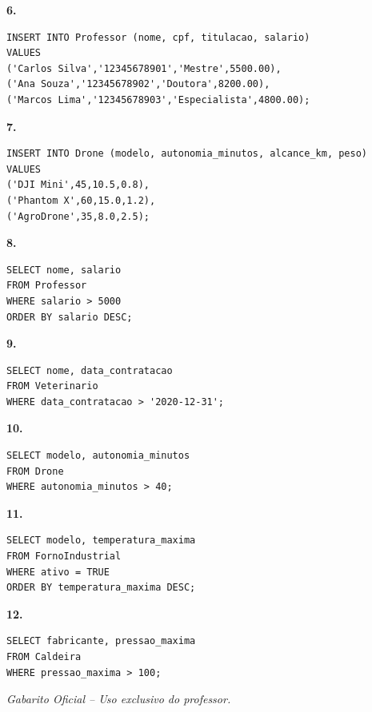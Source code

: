 \documentclass[12pt]{article}
\begin{document}
\textbf{6.}
\begin{resposta}
\begin{lstlisting}
INSERT INTO Professor (nome, cpf, titulacao, salario)
VALUES
('Carlos Silva','12345678901','Mestre',5500.00),
('Ana Souza','12345678902','Doutora',8200.00),
('Marcos Lima','12345678903','Especialista',4800.00);
\end{lstlisting}
\end{resposta}

\textbf{7.}
\begin{resposta}
\begin{lstlisting}
INSERT INTO Drone (modelo, autonomia_minutos, alcance_km, peso)
VALUES
('DJI Mini',45,10.5,0.8),
('Phantom X',60,15.0,1.2),
('AgroDrone',35,8.0,2.5);
\end{lstlisting}
\end{resposta}

\textbf{8.}
\begin{resposta}
\begin{lstlisting}
SELECT nome, salario
FROM Professor
WHERE salario > 5000
ORDER BY salario DESC;
\end{lstlisting}
\end{resposta}

\textbf{9.}
\begin{resposta}
\begin{lstlisting}
SELECT nome, data_contratacao
FROM Veterinario
WHERE data_contratacao > '2020-12-31';
\end{lstlisting}
\end{resposta}

\textbf{10.}
\begin{resposta}
\begin{lstlisting}
SELECT modelo, autonomia_minutos
FROM Drone
WHERE autonomia_minutos > 40;
\end{lstlisting}
\end{resposta}

\textbf{11.}
\begin{resposta}
\begin{lstlisting}
SELECT modelo, temperatura_maxima
FROM FornoIndustrial
WHERE ativo = TRUE
ORDER BY temperatura_maxima DESC;
\end{lstlisting}
\end{resposta}

\textbf{12.}
\begin{resposta}
\begin{lstlisting}
SELECT fabricante, pressao_maxima
FROM Caldeira
WHERE pressao_maxima > 100;
\end{lstlisting}
\end{resposta}

\vspace{0.8cm}

\begin{center}
\textit{Gabarito Oficial – Uso exclusivo do professor.}
\end{center}
\end{document}
